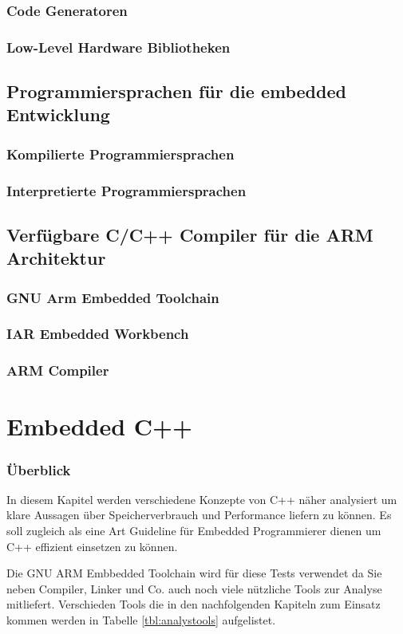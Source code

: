 \documentclass[MES,Master,ngerman]{twbook}%
\begin{document}
\subsection{Code Generatoren}
\subsection{Low-Level Hardware Bibliotheken}
\section{Programmiersprachen für die embedded Entwicklung}
\subsection{Kompilierte Programmiersprachen}
\subsection{Interpretierte Programmiersprachen}
\section{Verfügbare C/C++ Compiler für die ARM Architektur}
\subsection{GNU Arm Embedded Toolchain}
\subsection{IAR Embedded Workbench}
\subsection{ARM Compiler}


\chapter{Embedded C++}
\subsection{Überblick}
In diesem Kapitel werden verschiedene Konzepte von C++ näher analysiert um klare Aussagen über Speicherverbrauch und Performance liefern zu können. Es soll zugleich als eine Art Guideline für Embedded Programmierer dienen um C++ effizient einsetzen zu können. \newline 

Die GNU ARM Embbedded Toolchain wird für diese Tests verwendet da Sie neben Compiler, Linker und Co. auch noch viele nützliche Tools zur Analyse mitliefert. Verschieden Tools die in den nachfolgenden Kapiteln zum Einsatz kommen werden in Tabelle \ref{tbl:analystools} aufgelistet.
\end{document}
